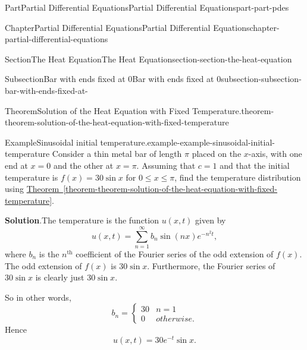 \documentclass[twoside,10pt,]{book}
\newcommand{\blocktitlefont}{\relax}
\newcommand{\xreffont}{\relax}
\numberwithin{equation}{part}
\renewcommand{\th}{\text{th}}
\newcommand{\amp}{&}
\begin{document}
\begin{partptx}{Part}{Partial Differential Equations}{}{Partial Differential Equations}{}{}{part-part-pdes}
\begin{chapterptx}{Chapter}{Partial Differential Equations}{}{Partial Differential Equations}{}{}{chapter-partial-differential-equations}
\begin{sectionptx}{Section}{The Heat Equation}{}{The Heat Equation}{}{}{section-section-the-heat-equation}
\begin{subsectionptx}{Subsection}{Bar with ends fixed at \(0\)}{}{Bar with ends fixed at \(0\)}{}{}{subsection-subsection-bar-with-ends-fixed-at-}
\begin{theorem}{Theorem}{Solution of the Heat Equation with Fixed Temperature.}{}{theorem-theorem-solution-of-the-heat-equation-with-fixed-temperature}
%
\end{theorem}
\begin{example}{Example}{Sinusoidal initial temperature.}{example-example-sinusoidal-initial-temperature}%
Consider a thin metal bar of length \(\pi\) placed on the \(x\)-axis, with one end at \(x=0\) and the other at \(x=\pi\). Assuming that \(c=1\) and that the initial temperature is \(f(x) = 30\sin x\) for \(0\leq x\leq\pi\), find the temperature distribution using \hyperref[theorem-theorem-solution-of-the-heat-equation-with-fixed-temperature]{Theorem~{\xreffont\ref{theorem-theorem-solution-of-the-heat-equation-with-fixed-temperature}}}.%
\par\smallskip%
\noindent\textbf{\blocktitlefont Solution}.\hypertarget{solution-example-sinusoidal-initial-temperature-c}{}\quad{}The temperature is the function \(u(x,t)\) given by%
\begin{equation*}
u(x,t) = \sum_{n=1}^{\infty}b_{n}\sin(n x)e^{-n^{2}t},
\end{equation*}
where \(b_{n}\) is the \(n^{\th}\) coefficient of the Fourier series of the odd extension of \(f(x)\). The odd extension of \(f(x)\) is \(30\sin x\). Furthermore, the Fourier series of \(30\sin x\) is clearly just \(30\sin x\).%
\par
So in other words,%
\begin{equation*}
b_{n} = \begin{cases} 30 \amp n=1 \\ 0 \amp otherwise.\end{cases}
\end{equation*}
Hence%
\begin{equation*}
u(x,t) = 30e^{-t}\sin x.
\end{equation*}
%
\end{example}
\end{subsectionptx}
\end{sectionptx}
\end{chapterptx}
  \end{partptx}
%
\appendix%
%
\end{document}
